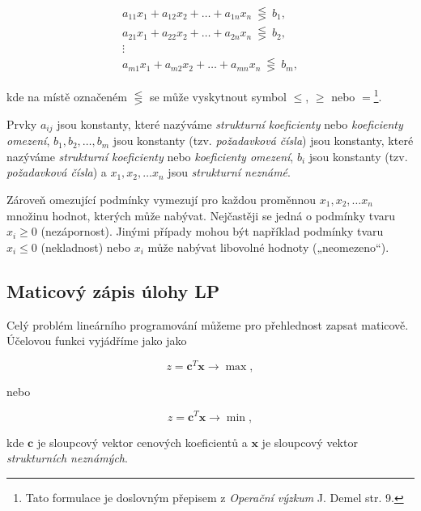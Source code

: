 \begin{equation}
    \begin{gathered}
        a_{11}x_1 + a_{12}x_2 + \ldots + a_{1n}x_n \ \lesseqgtr \ b_1, \\
        a_{21}x_1 + a_{22}x_2 + \ldots + a_{2n}x_n \ \lesseqgtr \ b_2, \\
        \vdots \\
        a_{m1}x_1 + a_{m2}x_2 + \ldots + a_{mn}x_n \ \lesseqgtr \ b_m,
    \end{gathered}
\end{equation}

kde na místě označeném $\lesseqgtr$ se může vyskytnout symbol $\leq$, $\geq$ nebo $=$\footnote{Tato formulace je doslovným přepisem z \textit{Operační výzkum} J. Demel \cite{demel} str. 9.}.

Prvky $a_{ij}$ jsou konstanty, které nazýváme \textit{strukturní koeficienty} nebo \textit{koeficienty omezení},
$b_1, b_2, \ldots, b_m$
jsou konstanty (tzv. \textit{požadavková čísla})
jsou konstanty, které nazýváme \textit{strukturní koeficienty} nebo \textit{koeficienty omezení}, $b_i$ jsou konstanty (tzv. \textit{požadavková čísla})
a $x_1, x_2, \ldots x_n$ jsou \textit{strukturní neznámé}.

Zároveň omezující podmínky vymezují pro každou proměnnou $x_1, x_2, \ldots x_n$ množinu hodnot, kterých může nabývat. 
Nejčastěji se jedná o podmínky tvaru $x_i \geq 0$ (nezápornost).
Jinými případy mohou být například podmínky tvaru $x_i \leq 0$ (nekladnost) nebo $x_i$ může nabývat libovolné hodnoty („neomezeno“).

\subsection{Maticový zápis úlohy LP}

Celý problém lineárního programování můžeme pro přehlednost zapsat maticově.
Účelovou funkci vyjádříme jako
jako

\begin{equation}
    z = \bm{c}^T\bm{x} \rightarrow \max,
\end{equation}

nebo

\begin{equation}
    z = \bm{c}^T\bm{x} \rightarrow \min,
\end{equation}

kde $\bm{c}$ je sloupcový vektor cenových koeficientů a $\bm{x}$ je sloupcový vektor \textit{strukturních neznámých}.


